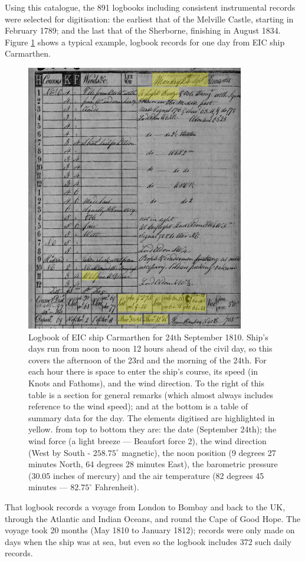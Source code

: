 \documentclass[CP]{copernicus}
\begin{document}
Using this catalogue, the 891 logbooks including consistent instrumental records were selected for digitisation: the earliest that of the Melville Castle, starting in February 1789; and the last that of the Sherborne, finishing in August 1834. Figure \ref{Ftl1} shows a typical example, logbook records for one day from EIC ship Carmarthen.
\begin{figure}[!hbp]
\begin{center}
\includegraphics[angle=0, width=0.85\textwidth]{fig2.png}
\caption{Logbook of EIC ship Carmarthen for 24th September 1810. Ship's days run from noon to noon 12 hours ahead of the civil day, so this covers the afternoon of the 23rd and the morning of the 24th. For each hour there is space to enter the ship's course, its speed (in Knots and Fathoms), and the wind direction. To the right of this table is a section for general remarks (which almost always includes reference to the wind speed); and at the bottom is a table of summary data for the day. The elements digitised are highlighted in yellow. from top to bottom they are: the date (September 24th); the wind force (a light breeze --- Beaufort force 2), the wind direction (West by South - $258.75^\circ$ magnetic), the noon position (9 degrees 27 minutes North, 64 degrees 28 minutes East), the barometric pressure (30.05 inches of mercury) and the air temperature (82 degrees 45 minutes --- $82.75^\circ$ Fahrenheit).}
\label{Ftl1}
\end{center}
\end{figure}
That logbook records a voyage from London to Bombay and back to the UK, through the Atlantic and Indian Oceans, and round the Cape of Good Hope. The voyage took 20 months (May 1810 to January 1812); records were only made on days when the ship was at sea, but even so the logbook includes 372 such daily records.
\end{document}
